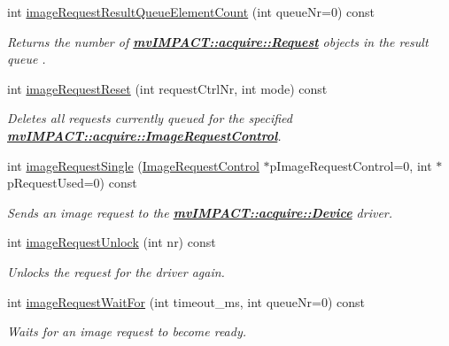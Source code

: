 \begin{DoxyCompactItemize}
int \hyperlink{classmv_i_m_p_a_c_t_1_1acquire_1_1_function_interface_a7e608625f2db03327c3fe9964967d0bc}{image\+Request\+Result\+Queue\+Element\+Count} (int queue\+Nr=0) const 
\begin{DoxyCompactList}\small\item\em Returns the number of {\bfseries \hyperlink{classmv_i_m_p_a_c_t_1_1acquire_1_1_request}{mv\+I\+M\+P\+A\+C\+T\+::acquire\+::\+Request}} objects in the result queue . \end{DoxyCompactList}\item 
int \hyperlink{classmv_i_m_p_a_c_t_1_1acquire_1_1_function_interface_a234b2c6e31f3e83629501da47095c54f}{image\+Request\+Reset} (int request\+Ctrl\+Nr, int mode) const 
\begin{DoxyCompactList}\small\item\em Deletes all requests currently queued for the specified {\bfseries \hyperlink{classmv_i_m_p_a_c_t_1_1acquire_1_1_image_request_control}{mv\+I\+M\+P\+A\+C\+T\+::acquire\+::\+Image\+Request\+Control}}. \end{DoxyCompactList}\item 
int \hyperlink{classmv_i_m_p_a_c_t_1_1acquire_1_1_function_interface_a59571120b5e81c3af596ea5da5dc63ba}{image\+Request\+Single} (\hyperlink{classmv_i_m_p_a_c_t_1_1acquire_1_1_image_request_control}{Image\+Request\+Control} $\ast$p\+Image\+Request\+Control=0, int $\ast$p\+Request\+Used=0) const 
\begin{DoxyCompactList}\small\item\em Sends an image request to the {\bfseries \hyperlink{classmv_i_m_p_a_c_t_1_1acquire_1_1_device}{mv\+I\+M\+P\+A\+C\+T\+::acquire\+::\+Device}} driver. \end{DoxyCompactList}\item 
int \hyperlink{classmv_i_m_p_a_c_t_1_1acquire_1_1_function_interface_a378a338217d5a681e880a0d9395f1a62}{image\+Request\+Unlock} (int nr) const 
\begin{DoxyCompactList}\small\item\em Unlocks the request for the driver again. \end{DoxyCompactList}\item 
int \hyperlink{classmv_i_m_p_a_c_t_1_1acquire_1_1_function_interface_a4cefdfda8e8940736ae9a4c97b6de8c9}{image\+Request\+Wait\+For} (int timeout\+\_\+ms, int queue\+Nr=0) const 
\begin{DoxyCompactList}\small\item\em Waits for an image request to become ready. \end{DoxyCompactList}\item 

\end{DoxyCompactItemize}
